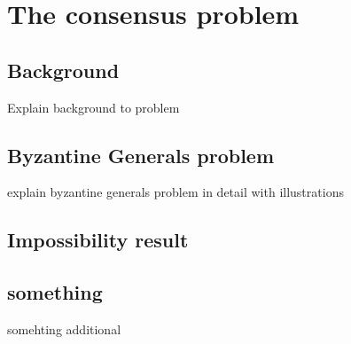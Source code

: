 \section{The consensus problem}
\subsection{Background}
Explain background to problem

\subsection{Byzantine Generals problem}
explain byzantine generals problem in detail with illustrations

\subsection{Impossibility result}

\subsection{something}
somehting additional
\clearpage